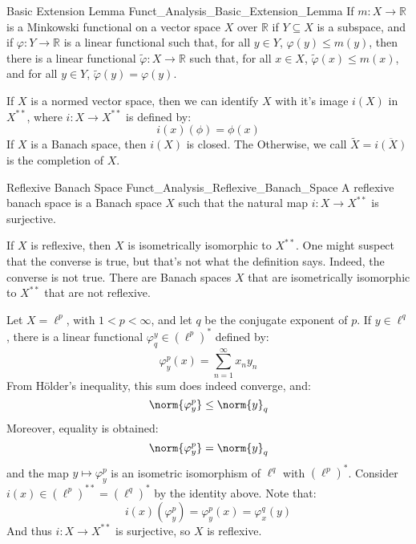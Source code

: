     \begin{ltheorem}{Basic Extension Lemma}
          {Funct_Analysis_Basic_Extension_Lemma}
        If $m:X\rightarrow\mathbb{R}$ is a Minkowski functional
        on a vector space $X$ over $\mathbb{R}$ if
        $Y\subseteq{X}$ is a subspace, and if
        $\varphi:Y\rightarrow\mathbb{R}$ is a linear functional
        such that, for all $y\in{Y}$,
        $\varphi(y)\leq{m}(y)$, then there is a linear
        functional $\tilde{\varphi}:X\rightarrow\mathbb{R}$
        such that, for all $x\in{X}$,
        $\tilde{\varphi}(x)\leq{m}(x)$, and for all $y\in{Y}$,
        $\tilde{\varphi}(y)=\varphi(y)$.
    \end{ltheorem}
    If $X$ is a normed vector space, then we can identify
    $X$ with it's image $i(X)$ in $X^{**}$, where
    $i:X\rightarrow{X}^{**}$ is defined by:
    \begin{equation}
        i(x)(\phi)=\phi(x)
    \end{equation}
    If $X$ is a Banach space, then $i(X)$ is closed. The
    Otherwise, we call $\tilde{X}=\overline{i(X)}$ is the
    completion of $X$.
    \begin{ldefinition}{Reflexive Banach Space}
          {Funct_Analysis_Reflexive_Banach_Space}
        A reflexive banach space is a Banach space $X$ such
        that the natural map $i:X\rightarrow{X}^{**}$ is
        surjective.
    \end{ldefinition}
    If $X$ is reflexive, then $X$ is isometrically isomorphic
    to $X^{**}$. One might suspect that the converse is true,
    but that's not what the definition says. Indeed, the
    converse is not true. There are Banach spaces $X$ that
    are isometrically isomorphic to $X^{**}$ that are not
    reflexive.
    \begin{lexample}
        Let $X=\ell^{p}$, with $1<p<\infty$, and let
        $q$ be the conjugate exponent of $p$. If $y\in\ell^{q}$,
        there is a linear functional
        $\varphi_{q}^{y}\in(\ell^{p})^{*}$ defined by:
        \begin{equation}
            \varphi_{y}^{p}(x)=\sum_{n=1}^{\infty}x_{n}y_{n}
        \end{equation}
        From H\"{o}lder's inequality, this sum does indeed
        converge, and:
        \begin{equation}
            \norm{\varphi_{y}^{p}}\leq\norm{y}_{q}
        \end{equation}
        Moreover, equality is obtained:
        \begin{equation}
            \norm{\varphi_{y}^{p}}=\norm{y}_{q}
        \end{equation}
        and the map $y\mapsto\varphi_{y}^{p}$ is an
        isometric isomorphism of $\ell^{q}$ with
        $(\ell^{p})^{*}$. Consider
        $i(x)\in(\ell^{p})^{**}=(\ell^{q})^{*}$ by
        the identity above. Note that:
        \begin{equation}
            i(x)(\varphi_{y}^{p})=\varphi_{y}^{p}(x)
            =\varphi_{x}^{q}(y)
        \end{equation}
        And thus $i:X\rightarrow{X}^{**}$ is surjective, so
        $X$ is reflexive.
    \end{lexample}
